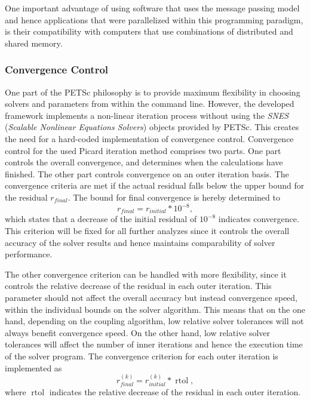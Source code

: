 One important advantage of using software that uses the message passing model and hence applications that were parallelized within this programming paradigm, is their compatibility with computers that use combinations of distributed and shared memory.

\subsubsection{Convergence Control} 
\label{sec:convergence}
One part of the PETSc philosophy is to provide maximum flexibility in choosing solvers and parameters from within the command line. However, the developed framework implements a non-linear iteration process without using the \emph{SNES} (\emph{Scalable Nonlinear Equations Solvers}) objects provided by PETSc. This creates the need for a hard-coded implementation of convergence control. Convergence control for the used Picard iteration method comprises two parts. One part controls the overall convergence, and determines when the calculations have finished. The other part controls convergence on an outer iteration basis. The convergence criteria are met if the actual residual falls below the upper bound for the residual \(r_{final}\). The bound for final convergence is hereby determined to
\begin{displaymath}
  r_{final} = r_{initial} * 10^{-8},
\end{displaymath}
which states that a decrease of the initial residual of \(10^{-8}\) indicates convergence. This criterion will be fixed for all further analyzes since it controls the overall accuracy of the solver results and hence maintains comparability of solver performance. 

The other convergence criterion can be handled with more flexibility, since it controls the relative decrease of the residual in each outer iteration. This parameter should not affect the overall accuracy but instead convergence speed, within the individual bounds on the solver algorithm. This means that on the one hand, depending on the coupling algorithm, low relative solver tolerances will not always benefit convergence speed. On the other hand, low relative solver tolerances will affect the number of inner iterations and hence the execution time of the solver program. The convergence criterion for each outer iteration is implemented as
\begin{displaymath}
  r_{final}^{(k)} = r_{initial}^{(k)} * \operatorname{rtol},
\end{displaymath}
where \(\operatorname{rtol}\) indicates the relative decrease of the residual in each outer iteration. 

